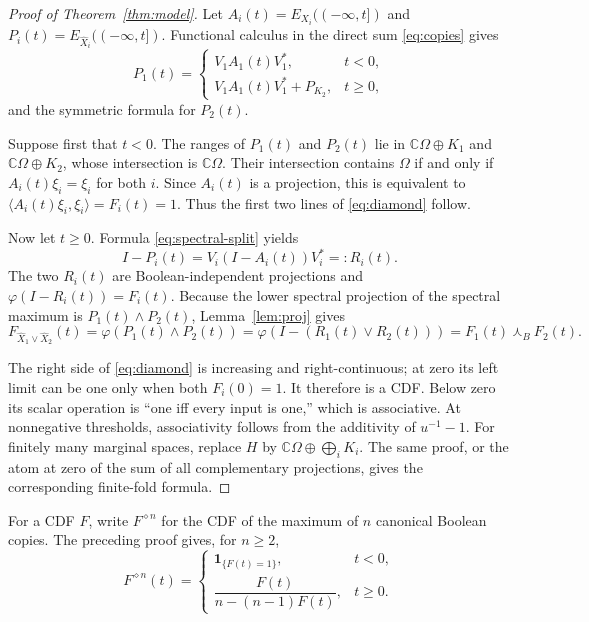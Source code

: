 \documentclass[11pt]{article}
\newcommand{\Bmeet}{\mathbin{\curlywedge_{\!B}}}
\newcommand{\one}{\mathbf 1}
\begin{document}
\begin{proof}[Proof of Theorem~\ref{thm:model}]
Let $A_i(t)=E_{X_i}(({-\infty},t])$ and $P_i(t)=
E_{\widehat X_i}(({-\infty},t])$.  Functional calculus in the direct sum
\eqref{eq:copies} gives
\begin{equation}\label{eq:spectral-split}
P_1(t)=\begin{cases}V_1A_1(t)V_1^*,&t<0,\\
V_1A_1(t)V_1^*+P_{K_2},&t\geq0,
\end{cases}
\end{equation}
and the symmetric formula for $P_2(t)$.

Suppose first that $t<0$.  The ranges of $P_1(t)$ and $P_2(t)$ lie in
$\mathbb C\Omega\oplus K_1$ and $\mathbb C\Omega\oplus K_2$, whose
intersection is $\mathbb C\Omega$.  Their intersection contains $\Omega$ if
and only if $A_i(t)\xi_i=\xi_i$ for both $i$.  Since $A_i(t)$ is a
projection, this is equivalent to
$\langle A_i(t)\xi_i,\xi_i\rangle=F_i(t)=1$.  Thus the first two lines of
\eqref{eq:diamond} follow.

Now let $t\geq0$.  Formula \eqref{eq:spectral-split} yields
\[
 I-P_i(t)=V_i(I-A_i(t))V_i^*=:R_i(t).
\]
The two $R_i(t)$ are Boolean-independent projections and
$\varphi(I-R_i(t))=F_i(t)$.  Because the lower spectral projection of the
spectral maximum is $P_1(t)\wedge P_2(t)$, Lemma~\ref{lem:proj} gives
\[
F_{\widehat X_1\vee\widehat X_2}(t)
=\varphi(P_1(t)\wedge P_2(t))
=\varphi(I-(R_1(t)\vee R_2(t)))
=F_1(t)\Bmeet F_2(t).
\]

The right side of \eqref{eq:diamond} is increasing and right-continuous; at
zero its left limit can be one only when both $F_i(0)=1$.  It therefore is a
CDF.  Below zero its scalar operation is ``one iff every input is one,''
which is associative.  At nonnegative thresholds, associativity follows from
the additivity of $u^{-1}-1$.  For finitely many marginal spaces, replace
$H$ by $\mathbb C\Omega\oplus\bigoplus_iK_i$.  The same proof, or the atom at
zero of the sum of all complementary projections, gives the corresponding
finite-fold formula.
\end{proof}

For a CDF $F$, write $F^{\diamond n}$ for the CDF of the maximum of $n$
canonical Boolean copies.  The preceding proof gives, for $n\geq2$,
\begin{equation}\label{eq:nfold}
F^{\diamond n}(t)=
\begin{cases}
\one_{\{F(t)=1\}},&t<0,\\[2pt]
\dfrac{F(t)}{n-(n-1)F(t)},&t\geq0.
\end{cases}
\end{equation}
\end{document}
